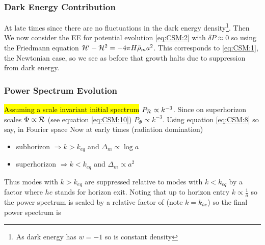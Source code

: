 \documentclass{article}
\begin{document}
\subsubsection*{Dark Energy Contribution} At late times 
since there are no fluctuations in the dark energy density\footnote{As dark energy has $w = -1$ so is constant density}. Then 
We now consider the EE for potential evolution \ref{eq:CSM:2} with $\delta P \approx 0$ so 
using the Friedmann equation $ \mathcal{H}^\prime - \mathcal{H}^2 = -4 \pi H \bar{\rho}_m a^2$. This corresponds to \ref{eq:CSM:1}, the Newtonian case, so we see as before that growth halts due to suppression from dark energy. 



\subsubsection*{Power Spectrum Evolution}
\hl{Assuming a scale invariant initial spectrum} $P_{\mathcal{R}} \propto k^{-3}$. Since on superhorizon scales $\Phi \propto \mathcal{R}$ (see equation \ref{eq:CSM:10}) $P_\Phi \propto k^{-3}$. Using equation \ref{eq:CSM:8} so say, in Fourier space 
Now at early times (radiation domination) 
\begin{itemize}
    \item subhorizon $\Rightarrow k> k_{eq}$ and $\Delta_m \propto \log a $
    \item superhorizon $\Rightarrow k < k_{eq}$ and $\Delta_m \propto a^2$
\end{itemize}
Thus modes with $k > k_{eq}$ are suppressed relative to modes with $k < k_{eq}$ by a factor 
where $he$ stands for horizon exit. Noting that up to horizon entry $k \propto \frac{1}{a}$ so the power spectrum is scaled by a relative factor of 
(note $k = k_{he}$) so the final power spectrum is 
\eq{
P_\Delta(k) \propto \left\{ \begin{array}{cc} k^{-3} \left[[\log\left(\frac{k}{k_{eq}}\right)\right]^2 & k>k_{eq} \\ k & k<k_{eq} \end{array} \right.
}
\end{document}
